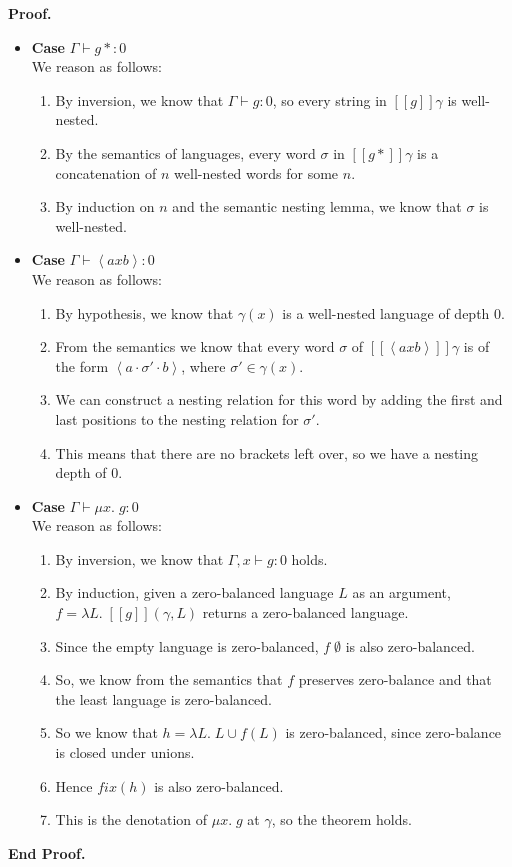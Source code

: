 \documentclass{article}
\newcommand{\fix}[2]{\mu {#1}.\;{#2}}
\newcommand{\lft}[1]{\left<{#1}\right.}
\newcommand{\rgt}[1]{\left.{#1}\right>}
\newcommand{\judgebalance}[3][\Gamma]{{#1} \vdash {#2} : {#3}}
\newcommand{\interp}[1]{[\![{#1}]\!]}
\newcommand{\fun}[2]{\lambda {#1}.\;{#2}}
\newenvironment{proof}{\noindent\textbf{Proof.}}
{\noindent\textbf{End Proof.}}
\newenvironment{caseblock}{\begin{itemize}}{\end{itemize}}
\newenvironment{case}[1]{\item \textbf{Case} {#1}\\}{}
\begin{document}
\begin{proof}
\begin{caseblock}
  \begin{case}{$\judgebalance{g*}{0}$}
    We reason as follows: 
    \begin{enumerate}
      \item By inversion, we know that $\judgebalance{g}{0}$, so every string in $\interp{g}\gamma$ is 
        well-nested. 
      \item By the semantics of languages, every word $\sigma$ in $\interp{g*}\gamma$ is a concatenation of 
        $n$ well-nested words for some $n$. 
      \item By induction on $n$ and the semantic nesting lemma, we know that $\sigma$ is well-nested. 
    \end{enumerate}
  \end{case}

  \begin{case}{$\judgebalance{\lft{a}x\rgt{b}}{0}$}
    We reason as follows: 
    \begin{enumerate}
      \item By hypothesis, we know that $\gamma(x)$ is a well-nested language of depth 0. 
      \item From the semantics we know that every word $\sigma$ of $\interp{\lft{a}x\rgt{b}}\gamma$ is 
        of the form $\lft{a}\cdot\sigma'\cdot\rgt{b}$, where $\sigma' \in \gamma(x)$. 
      \item We can construct a nesting relation for this word by adding the first and last positions 
        to the nesting relation for $\sigma'$. 
      \item This means that there are no brackets left over, so we have a nesting depth of 0. 
    \end{enumerate}
  \end{case}

  \begin{case}{$\judgebalance{\fix{x}{g}}{0}$}
    We reason as follows: 
    \begin{enumerate}
      \item By inversion, we know that $\judgebalance[\Gamma, x]{g}{0}$ holds. 
      \item By induction, given a zero-balanced language $L$ as an argument, $f = \fun{L}{\interp{g}(\gamma,L)}$
        returns a zero-balanced language. 
      \item Since the empty language is zero-balanced, $f\;\emptyset$ is
        also zero-balanced. 
      \item So, we know from the semantics that $f$ preserves zero-balance and that the least language is zero-balanced. 
      \item So we know that $h = \fun{L}{L \cup f(L)}$ is zero-balanced, since zero-balance is closed under unions. 
      \item Hence $\mathit{fix}(h)$ is also zero-balanced. 
      \item This is the denotation of $\fix{x}{g}$ at $\gamma$, so the theorem holds. 
    \end{enumerate}
  \end{case}


\end{caseblock}
\end{proof}
\end{document}
